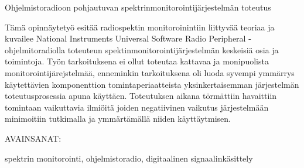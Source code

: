 \vspace{10mm}
{\huge Ohjelmistoradioon pohjautuvan spektrinmonitorointijärjestelmän toteutus \par}

\vspace{10mm}

Tämä opinnäytetyö esitää radiospektin monitoroinintiin liittyvää teoriaa
ja kuvailee National Instruments Universal Software Radio Peripheral -ohjelmitoradiolla
toteuteun spektinmonitorointijärjestelmän keskeisiä osia ja toimintoja.
Työn tarkoituksena ei ollut toteutaa kattavaa ja monipuolista monitorointijärejstelmää,
enneminkin tarkoituksena oli luoda syvempi ymmärrys käytettävien komponenttion
tomintaperiaatteista yksinkertaisemman järjestelmän toteutusprosessia apuna käyttäen.
Toteutuksen aikana törmättiin havaittiin tomintaan vaikuttavia ilmiöitä joiden negatiivinen
vaikutus järjestelmään minimoitiin tutkimalla ja ymmärtämällä niiden käyttäytmisen.

\vspace{30mm}

AVAINSANAT:

spektrin monitorointi, ohjelmistoradio, digitaalinen signaalinkäsittely
